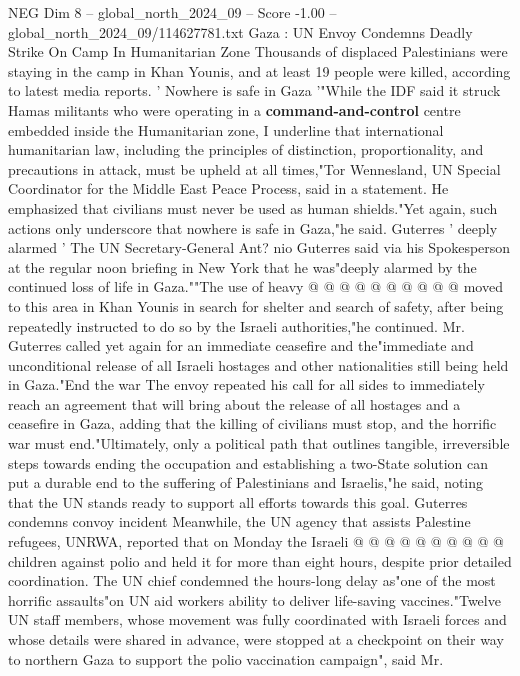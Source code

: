\begin{textsample}{NEG Dim 8 – global\_north\_2024\_09 – Score -1.00 – global\_north\_2024\_09/114627781.txt}  \label{ex:f8_neg_374}
Gaza : UN Envoy Condemns Deadly Strike On Camp In Humanitarian Zone Thousands of displaced Palestinians were staying in the camp in Khan Younis, and at least 19 people were killed, according to latest media reports. ' Nowhere is safe in Gaza '"While the IDF said it struck Hamas militants who were operating in a \textbf{command-and-control} centre embedded inside the Humanitarian zone, I underline that international humanitarian law, including the principles of distinction, proportionality, and precautions in attack, must be upheld at all times,"Tor Wennesland, UN Special Coordinator for the Middle East Peace Process, said in a statement.
He emphasized that civilians must never be used as human shields."Yet again, such actions only underscore that nowhere is safe in Gaza,"he said.
Guterres ' deeply alarmed ' The UN Secretary-General Ant? nio Guterres said via his Spokesperson at the regular noon briefing in New York that he was"deeply alarmed by the continued loss of life in Gaza.""The use of heavy @ @ @ @ @ @ @ @ @ @ moved to this area in Khan Younis in search for shelter and search of safety, after being repeatedly instructed to do so by the Israeli authorities,"he continued.
Mr.
Guterres called yet again for an immediate ceasefire and the"immediate and unconditional release of all Israeli hostages and other nationalities still being held in Gaza."End the war The envoy repeated his call for all sides to immediately reach an agreement that will bring about the release of all hostages and a ceasefire in Gaza, adding that the killing of civilians must stop, and the horrific war must end."Ultimately, only a political path that outlines tangible, irreversible steps towards ending the occupation and establishing a two-State solution can put a durable end to the suffering of Palestinians and Israelis,"he said, noting that the UN stands ready to support all efforts towards this goal.
Guterres condemns convoy incident Meanwhile, the UN agency that assists Palestine refugees, UNRWA, reported that on Monday the Israeli @ @ @ @ @ @ @ @ @ @ children against polio and held it for more than eight hours, despite prior detailed coordination.
The UN chief condemned the hours-long delay as"one of the most horrific assaults"on UN aid workers ability to deliver life-saving vaccines."Twelve UN staff members, whose movement was fully coordinated with Israeli forces and whose details were shared in advance, were stopped at a checkpoint on their way to northern Gaza to support the polio vaccination campaign", said Mr.

\end{textsample}
